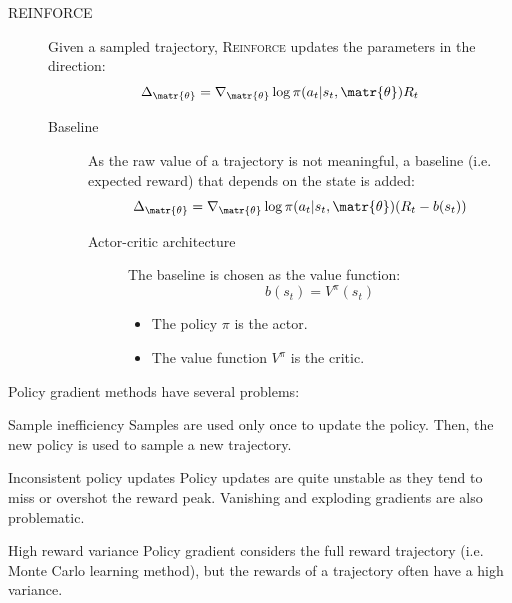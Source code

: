 \begin{description}
    \item[REINFORCE] 
        Given a sampled trajectory, \textsc{Reinforce} updates the parameters in the direction:
        \[ \Delta_\matr{\theta} = \nabla_\matr{\theta} \log \pi(a_t | s_t, \matr{\theta}) R_t \]

        \begin{description}
            \item[Baseline] 
                As the raw value of a trajectory is not meaningful, a baseline (i.e. expected reward) that depends on the state is added:
                \[ \Delta_\matr{\theta} = \nabla_\matr{\theta} \log \pi(a_t | s_t, \matr{\theta}) (R_t - b(s_t)) \]

                \begin{description}
                    \item[Actor-critic architecture] 
                        The baseline is chosen as the value function:
                        \[ b(s_t) = V^\pi(s_t) \]
                        \begin{itemize}
                            \item The policy $\pi$ is the actor.
                            \item The value function $V^\pi$ is the critic.
                        \end{itemize}
                \end{description}
        \end{description}
\end{description}

\begin{remark}
    Policy gradient methods have several problems:
    \begin{descriptionlist}
        \item[Sample inefficiency] 
            Samples are used only once to update the policy. Then, the new policy is used to sample a new trajectory.

        \item[Inconsistent policy updates] 
            Policy updates are quite unstable as they tend to miss or overshot the reward peak. Vanishing and exploding gradients are also problematic.

        \item[High reward variance] 
            Policy gradient considers the full reward trajectory (i.e. Monte Carlo learning method), but the rewards of a trajectory often have a high variance.
    \end{descriptionlist}
\end{remark}

